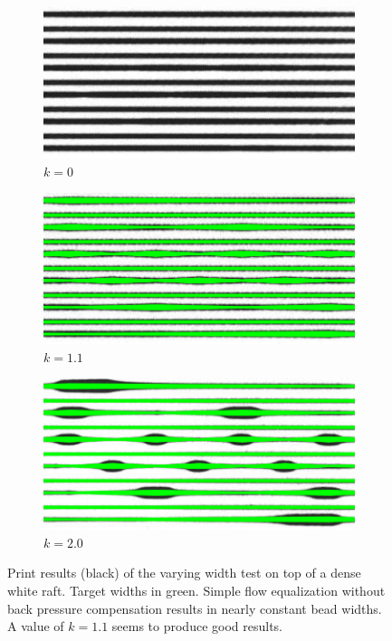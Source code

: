{\begin{figure}
\centering
\setlength{\figwidth}{0.32\columnwidth}
\setlength{\figheight}{0.5\columnwidth}
\begin{subfigure}[t]{\figwidth}\centering
\includegraphics[angle=90,height=\figheight]{sources-validation-backpressure_0_0}
\caption{$k=0$}\label{zero_back_pressure}
\end{subfigure}
\begin{subfigure}[t]{\figwidth}\centering
\includegraphics[angle=90,height=\figheight]{sources-validation-backpressure_1_1}
\caption{$k=1.1$}\label{back_pressure}
\end{subfigure}
\begin{subfigure}[t]{\figwidth}\centering
\includegraphics[angle=90,height=\figheight]{sources-validation-backpressure_2_0}
\caption{$k=2.0$}\label{too_much_back_pressure}
\end{subfigure}
\caption{
Print results (black) of the varying width test on top of a dense white raft.
Target widths in green.
 Simple flow equalization without back pressure compensation results in nearly constant bead widths.
 A value of $k=1.1$ seems to produce good results.
}
\label{back_pressure_compensation}
\end{figure}

}
